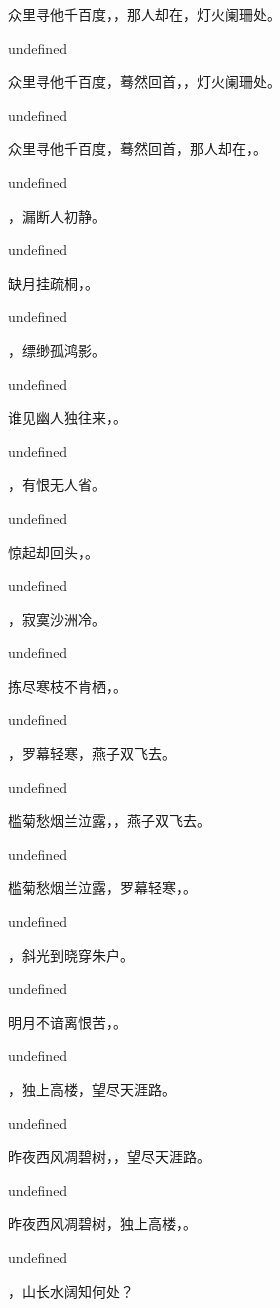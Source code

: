 \documentclass[12pt, a4paper, addpoints]{exam}
\begin{document}
\begin{questions}
\question[3] 众里寻他千百度，\fillin，那人却在，灯火阑珊处。

undefined

\question[3] 众里寻他千百度，蓦然回首，\fillin，灯火阑珊处。

undefined

\question[3] 众里寻他千百度，蓦然回首，那人却在，\fillin。

undefined

\question[3] \fillin，漏断人初静。

undefined

\question[3] 缺月挂疏桐，\fillin。

undefined

\question[3] \fillin，缥缈孤鸿影。

undefined

\question[3] 谁见幽人独往来，\fillin。

undefined

\question[3] \fillin，有恨无人省。

undefined

\question[3] 惊起却回头，\fillin。

undefined

\question[3] \fillin，寂寞沙洲冷。

undefined

\question[3] 拣尽寒枝不肯栖，\fillin。

undefined

\question[3] \fillin，罗幕轻寒，燕子双飞去。

undefined

\question[3] 槛菊愁烟兰泣露，\fillin，燕子双飞去。

undefined

\question[3] 槛菊愁烟兰泣露，罗幕轻寒，\fillin。

undefined

\question[3] \fillin，斜光到晓穿朱户。

undefined

\question[3] 明月不谙离恨苦，\fillin。

undefined

\question[3] \fillin，独上高楼，望尽天涯路。

undefined

\question[3] 昨夜西风凋碧树，\fillin，望尽天涯路。

undefined

\question[3] 昨夜西风凋碧树，独上高楼，\fillin。

undefined

\question[3] \fillin，山长水阔知何处？


\end{questions}
\end{document}
